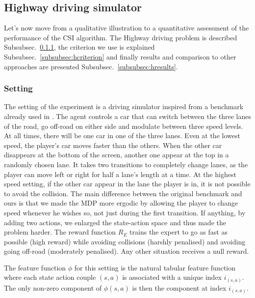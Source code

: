 \documentclass[smallextended]{svjour3}
\begin{document}
\subsection{Highway driving simulator}
\label{subsec:highway}
Let's now move from a qualitative illustration to a quantitative assessment of the performance of the CSI algorithm. The Highway driving problem is described Subsubsec.~\ref{subsubsec:hsetting}, the criterion we use is explained Subsubsec.~\ref{subsubsec:hcriterion} and finally results and comparison to other approaches are presented Subsubsec.~\ref{subsubsec:hresults}.
\subsubsection{Setting}
\label{subsubsec:hsetting}
The setting of the experiment is a driving simulator inspired from a benchmark already used in \cite{syed2008apprenticeship,syed2008game}. The agent controls a car that can switch between the three lanes of the road, go off-road on either side and modulate between three speed levels. At all times, there will be one car in one of the three lanes. Even at the lowest speed, the player's car moves faster than the others. When the other car disappears at the bottom of the screen, another one appear at the top in a randomly chosen lane. It takes two transitions to completely change lanes, as the player can move left or right for half a lane's length at a time. At the highest speed setting, if the other car appear in the lane the player is in, it is not possible to avoid the collision. The main difference between the original benchmark \cite{syed2008apprenticeship,syed2008game} and ours is that we made the MDP more ergodic by allowing the player to change speed whenever he wishes so, not just during the first transition. If anything, by adding two actions, we enlarged the state-action space and thus made the problem harder.
The reward function $R_E$ trains the expert to go as fast as possible (high reward) while avoiding collisions (harshly penalised) and avoiding going off-road (moderately penalised). Any other situation receives a null reward.

The feature function $\phi$ for this setting is the natural tabular feature function where each state action couple $(s,a)$ is associated with a unique index $i_{(s,a)}$. The only non-zero component of $\phi(s,a)$ is then the component at index $i_{(s,a)}$.
\end{document}
